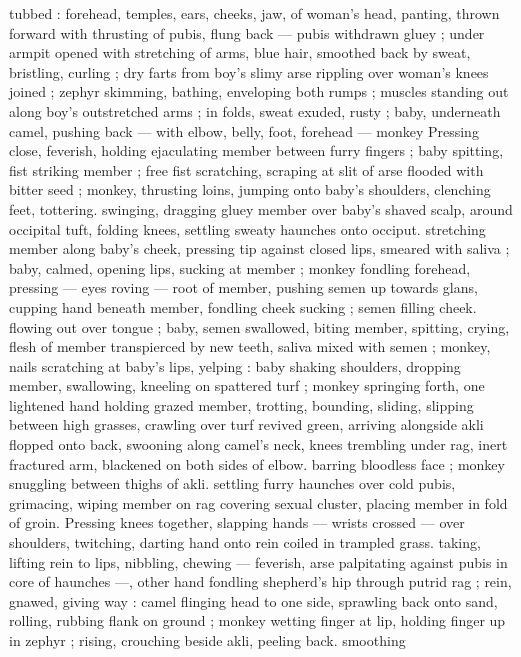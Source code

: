tubbed : forehead, temples, ears, cheeks, jaw, of woman's head, 
panting, thrown forward with thrusting of pubis, flung back --- pubis 
withdrawn gluey ; under armpit opened with stretching of arms, blue 
hair, smoothed back by sweat, bristling, curling ; dry farts from boy's 
slimy arse rippling over woman's knees joined ; zephyr skimming, 
bathing, enveloping both rumps ; muscles standing out along boy's 
outstretched arms ; in folds, sweat exuded, rusty ; baby, underneath 
camel, pushing back --- with elbow, belly, foot, forehead --- monkey 
Pressing close, feverish, holding ejaculating member between furry 
fingers ; baby spitting, fist striking member ; free fist scratching, 
scraping at slit of arse flooded with bitter seed ; monkey, thrusting 
loins, jumping onto baby's shoulders, clenching feet, tottering. 
swinging, dragging gluey member over baby's shaved scalp, around 
occipital tuft, folding knees, settling sweaty haunches onto occiput. 
stretching member along baby's cheek, pressing tip against closed 
lips, smeared with saliva ; baby, calmed, opening lips, sucking at 
member ; monkey fondling forehead, pressing --- eyes roving --- 
root of member, pushing semen up towards glans, cupping hand 
beneath member, fondling cheek sucking ; semen filling cheek. 
flowing out over tongue ; baby, semen swallowed, biting member, 
spitting, crying, flesh of member transpierced by new teeth, saliva 
mixed with semen ; monkey, nails scratching at baby's lips, yelping : 
baby shaking shoulders, dropping member, swallowing, kneeling on 
spattered turf ; monkey springing forth, one lightened hand holding 
grazed member, trotting, bounding, sliding, slipping between high 
grasses, crawling over turf revived green, arriving alongside akli 
flopped onto back, swooning along camel's neck, knees trembling 
under rag, inert fractured arm, blackened on both sides of elbow. 
barring bloodless face ; monkey snuggling between thighs of akli. 
settling furry haunches over cold pubis, grimacing, wiping member 
on rag covering sexual cluster, placing member in fold of groin. 
Pressing knees together, slapping hands --- wrists crossed --- over 
shoulders, twitching, darting hand onto rein coiled in trampled grass. 
taking, lifting rein to lips, nibbling, chewing --- feverish, arse 
palpitating against pubis in core of haunches ---, other hand 
fondling shepherd's hip through putrid rag ; rein, gnawed, giving way 
: camel flinging head to one side, sprawling back onto sand, rolling, 
rubbing flank on ground ; monkey wetting finger at lip, holding finger 
up in zephyr ; rising, crouching beside akli, peeling back. smoothing 
